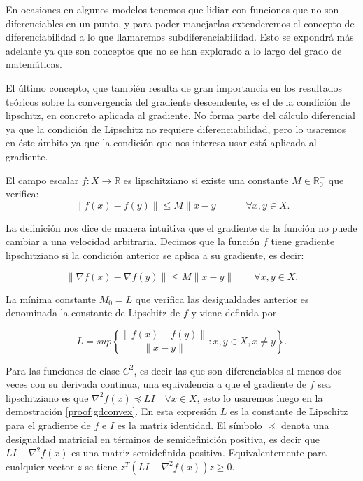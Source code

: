 En ocasiones en algunos modelos tenemos que lidiar con funciones que no son diferenciables en un punto, y para poder manejarlas extenderemos el concepto de diferenciabilidad a lo que llamaremos subdiferenciabilidad. Esto se expondrá más adelante ya que son conceptos que no se han explorado a lo largo del grado de matemáticas.


El último concepto, que también resulta de gran importancia en los resultados teóricos sobre la convergencia del gradiente descendente, es el de la condición de lipschitz, en concreto aplicada al gradiente. No forma parte del cálculo diferencial ya que la condición de Lipschitz no requiere diferenciabilidad, pero lo usaremos en éste ámbito ya que la condición que nos interesa usar está aplicada al gradiente.

\begin{definicion}
    El campo escalar $f:X \rightarrow \mathbb{R}$ es lipschitziano si existe una constante $M \in \mathbb{R}_0^+$ que verifica:
    $$ \| f(x) - f(y) \| \leq M \| x - y \| \qquad \forall x,y \in X.$$
\end{definicion}

La definición nos dice de manera intuitiva que el gradiente de la función no puede cambiar a una velocidad arbitraria. Decimos que la función $f$ tiene gradiente lipschitziano si la condición anterior se aplica a su gradiente, es decir:

$$\| \nabla f(x) - \nabla f(y) \| \leq M \| x - y \| \qquad \forall x,y \in X .$$


La mínima constante $M_0=L$ que verifica las desigualdades anterior es denominada la constante de Lipschitz de $f$ y viene definida por 

$$L=sup \left \{ \frac{\|f(x)-f(y)\|}{\|x - y \|} : x,y \in X, x \neq y \right \}.$$



Para las funciones de clase $C^2$, es decir las que son diferenciables al menos dos veces con su derivada continua, una equivalencia a que el gradiente de $f$ sea lipschitziano es que $\nabla^2 f(x) \preceq LI \quad \forall x \in X$, esto lo usaremos luego en la demostración \ref{proof:gdconvex}. En esta expresión $L$ es la constante de Lipschitz para el gradiente de $f$ e $I$ es la matriz identidad. El símbolo $\preceq$ denota una desigualdad matricial en términos de semidefinición positiva, es decir que $LI - \nabla^2f(x)$ es una matriz semidefinida positiva. Equivalentemente para cualquier vector $z$ se tiene $z^T \left ( LI - \nabla^2f(x) \right )z \geq 0$. 
